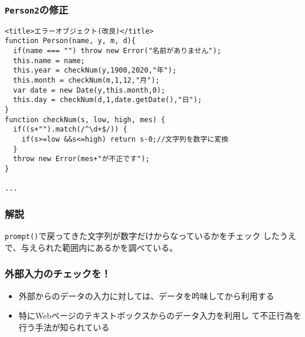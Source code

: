 \begin{frame}[containsverbatim]
 \frametitle{\protect\texttt{Person2}の修正}\small
\begin{Verbatim}
<title>エラーオブジェクト(改良)</title>
function Person(name, y, m, d){
  if(name === "") throw new Error("名前がありません");
  this.name = name;
  this.year = checkNum(y,1900,2020,"年");
  this.month = checkNum(m,1,12,"月");
  var date = new Date(y,this.month,0);
  this.day = checkNum(d,1,date.getDate(),"日");
}
function checkNum(s, low, high, mes) {
  if((s+"").match(/^\d+$/)) {
    if(s>=low &&s<=high) return s-0;//文字列を数字に変換
  }
  throw new Error(mes+"が不正です");
}
	
...
\end{Verbatim}
\end{frame}
\begin{frame}[containsverbatim]
 \frametitle{解説}
\texttt{prompt()}で戻ってきた文字列が数字だけからなっているかをチェック
 したうえで、与えられた範囲内にあるかを調べている。
\end{frame}
\begin{frame}[containsverbatim]
 \frametitle{外部入力のチェックを！}
\begin{itemize}
 \item 外部からのデータの入力に対しては、データを吟味してから利用する
 \item 特にWebページのテキストボックスからのデータ入力を利用し
て不正行為を行う手法が知られている
\end{itemize}
\end{frame}
